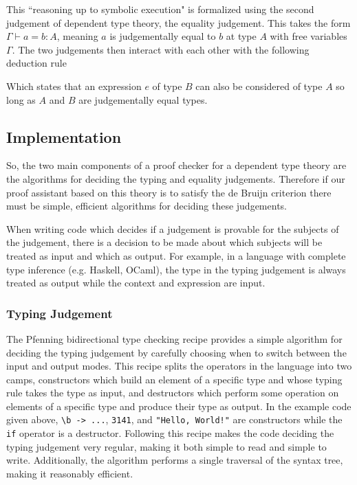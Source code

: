 \documentclass{article}
\begin{document}
This ``reasoning up to symbolic execution" is formalized using the second judgement of dependent type theory, the equality judgement.
This takes the form $\Gamma \vdash a = b : A$, meaning $a$ is judgementally equal to $b$ at type $A$ with free variables $\Gamma$.
The two judgements then interact with each other with the following deduction rule

\begin{mathpar}
\end{mathpar}

Which states that an expression $e$ of type $B$ can also be considered of type $A$ so long as $A$ and $B$ are judgementally equal types.

\subsection{Implementation}


So, the two main components of a proof checker for a dependent type theory are the algorithms for deciding the typing and equality judgements.
Therefore if our proof assistant based on this theory is to satisfy the de Bruijn criterion there must be simple, efficient algorithms for deciding these judgements.

When writing code which decides if a judgement is provable for the subjects of the judgement, there is a decision to be made about which subjects will be treated as input and which as output.
For example, in a language with complete type inference (e.g. Haskell, OCaml), the type in the typing judgement is always treated as output while the context and expression are input.

\subsubsection{Typing Judgement}

The Pfenning bidirectional type checking recipe \citep{Dunfield2021} provides a simple algorithm for deciding the typing judgement by carefully choosing when to switch between the input and output modes.
This recipe splits the operators in the language into two camps, constructors which build an element of a specific type and whose typing rule takes the type as input, and destructors which perform some operation on elements of a specific type and produce their type as output.
In the example code given above, \verb|\b -> ...|, \verb|3141|, and \verb|"Hello, World!"| are constructors while the \verb|if| operator is a destructor.
Following this recipe makes the code deciding the typing judgement very regular, making it both simple to read and simple to write.
Additionally, the algorithm performs a single traversal of the syntax tree, making it reasonably efficient.
\end{document}
